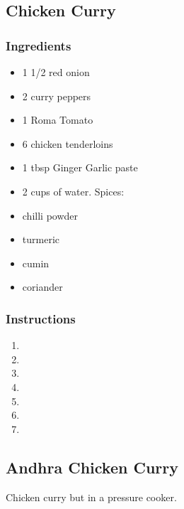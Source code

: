 \documentclass[11pt]{article}
\begin{document}
\subsection{Chicken Curry}
\label{sec:org8173fc8}
\subsubsection*{Ingredients}
\label{sec:org0424ae3}
\begin{itemize}
\item 1 1/2 red onion
\item 2 curry peppers
\item 1 Roma Tomato
\item 6 chicken tenderloins
\item 1 tbsp Ginger Garlic paste
\item 2 cups of water.
Spices:
\item chilli powder
\item turmeric
\item cumin
\item coriander
\end{itemize}
\subsubsection*{Instructions}
\label{sec:orgf05e904}
\begin{enumerate}
\item 

\item 

\item 

\item 

\item 

\item 

\item 
\end{enumerate}
\subsection{Andhra Chicken Curry}
\label{sec:orgc9fdb05}
Chicken curry but in a pressure cooker.
\end{document}
